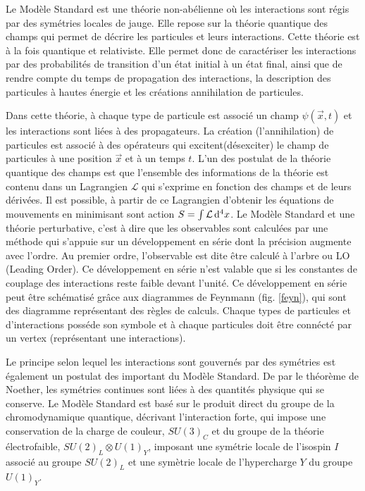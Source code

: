 Le Modèle Standard est une théorie non-abélienne où les interactions sont régis par des symétries locales de jauge. Elle repose sur la théorie quantique des champs qui permet de décrire les particules et leurs interactions. Cette théorie est à la fois quantique et relativiste. Elle permet donc de caractériser les interactions par des probabilités de transition d'un état initial à un état final, ainsi que de rendre compte du temps de propagation des interactions, la description des particules à hautes énergie et les créations annihilation de particules.

Dans cette théorie, à chaque type de particule est associé un champ $\psi(\vec{x},t)$ et les interactions sont liées à des propagateurs. La création (l'annihilation) de particules est associé à des opérateurs qui excitent(désexciter) le champ de particules à une position $\vec{x}$ et à un temps $t$. L'un des postulat de la théorie quantique des champs est que l'ensemble des informations de la théorie est contenu dans un Lagrangien $\mathcal{L}$ qui s'exprime en fonction des champs et de leurs dérivées. Il est possible, à partir de ce Lagrangien d'obtenir les équations de mouvements en minimisant sont action $S=\int\mathcal{L}\mathop{}\!\mathrm{d^4}{x}$.
Le Modèle Standard et une théorie perturbative, c'est à dire que les observables sont calculées par une méthode qui s'appuie sur un développement en série dont la précision augmente avec l'ordre. Au premier ordre, l'observable est dite être calculé à l'arbre ou LO (Leading Order). Ce développement en série n'est valable que si les constantes de couplage des interactions reste faible devant l'unité. Ce développement en série peut être schématisé grâce aux diagrammes de Feynmann (fig. \ref{feyn}), qui sont des diagramme représentant des règles de calculs. Chaque types de particules et d'interactions posséde son symbole et à chaque particules doit être connécté par un vertex (représentant une interactions).

Le principe selon lequel les interactions sont gouvernés par des symétries est également un postulat des important du Modèle Standard. De par le théorème de Noether, les symétries continues sont liées à des quantités physique qui se conserve. Le Modèle Standard est basé sur le produit direct du groupe de la chromodynamique quantique, décrivant l'interaction forte, qui impose une conservation de la charge de couleur, $SU(3)_{C}$ et du groupe de la théorie électrofaible, $SU(2)_{L} \otimes U(1)_{Y}$, imposant une symétrie locale de l'isospin $I$ associé au groupe $SU(2)_{L}$ et une symètrie locale de l'hypercharge $Y$ du groupe $U(1)_{Y}$.

